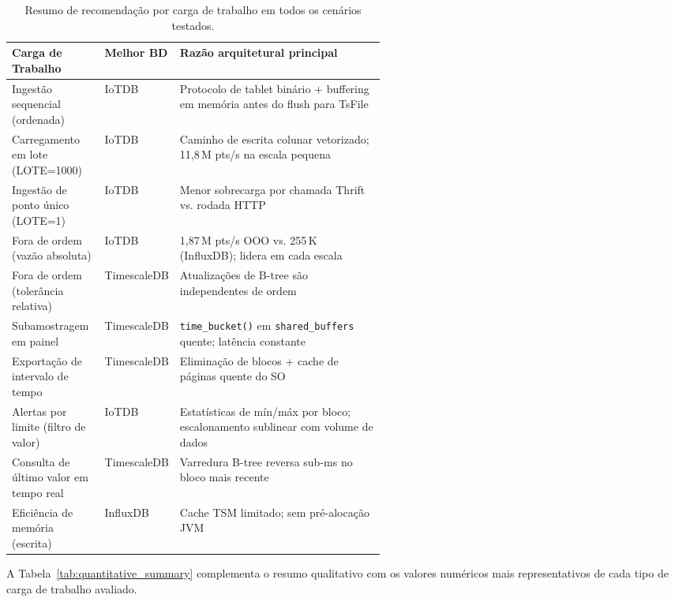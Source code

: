 \begin{table}[t]
  \centering
  \caption{Resumo de recomendação por carga de trabalho em todos os cenários testados.}
  \footnotesize
  \label{tab:summary}
  \begin{tabular}{l l p{0.55\linewidth}}
    \hline
    \textbf{Carga de Trabalho} & \textbf{Melhor BD} & \textbf{Razão arquitetural principal} \\
    \hline
    Ingestão sequencial (ordenada)          & IoTDB       & Protocolo de tablet binário + buffering em memória antes do flush para TsFile \\
    Carregamento em lote (LOTE=1000)        & IoTDB       & Caminho de escrita colunar vetorizado; 11,8\,M pts/s na escala pequena \\
    Ingestão de ponto único (LOTE=1)        & IoTDB       & Menor sobrecarga por chamada Thrift vs. rodada HTTP \\
    Fora de ordem (vazão absoluta)          & IoTDB       & 1,87\,M pts/s OOO vs. 255\,K (InfluxDB); lidera em cada escala \\
    Fora de ordem (tolerância relativa)     & TimescaleDB & Atualizações de B-tree são independentes de ordem \\
    Subamostragem em painel                 & TimescaleDB & \texttt{time\_bucket()} em \texttt{shared\_buffers} quente; latência constante \\
    Exportação de intervalo de tempo        & TimescaleDB & Eliminação de blocos + cache de páginas quente do SO \\
    Alertas por limite (filtro de valor)    & IoTDB       & Estatísticas de mín/máx por bloco; escalonamento sublinear com volume de dados \\
    Consulta de último valor em tempo real  & TimescaleDB & Varredura B-tree reversa sub-ms no bloco mais recente \\
    Eficiência de memória (escrita)         & InfluxDB    & Cache TSM limitado; sem pré-alocação JVM \\
    \hline
  \end{tabular}
\end{table}

A Tabela~\ref{tab:quantitative_summary} complementa o resumo qualitativo com os valores
numéricos mais representativos de cada tipo de carga de trabalho avaliado.

